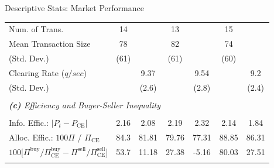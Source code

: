 \documentclass[10pt]{beamer}
\begin{document}
\begin{frame}{Descriptive Stats: Market Performance}
\begin{table}
{\begin{threeparttable}
\begin{tabular}{lcccccc}
     Num. of Trans.                             & 14        &           & 13        &           & 15        &           \\
     Mean Transaction Size                      & 78        &           & 82        &           & 74        &           \\
     \hspace{3mm}(Std. Dev.)             & (61)      &           & (61)      &           & (60)      &           \\
     Clearing Rate ($q/sec$)                 &           & 9.37      &           & 9.54      &           & 9.2       \\
     \hspace{3mm}(Std. Dev.)             &           & (2.6)     &           & (2.8)     &           & (2.4)     \\
     \\ [-1.8ex]
     \multicolumn{7}{l}{\textit{\textbf{(c)} Efficiency and Buyer-Seller Inequality}} \\
     \\ [-1.8ex]
     Info. Effic.: $\lvert P_t - P_{\text{CE}} \rvert $        & 2.16      & 2.08      & 2.19      & 2.32      & 2.14      & 1.84      \\     
     Alloc. Effic.: $100\Pi$ / $\Pi_{\text{CE}}$         & 84.3      & 81.81     & 79.76     & 77.31     & 88.85     & 86.31     \\
     
     ${100[\Pi^{\text{buy}}}/{\Pi^{\text{buy}}_{\text{CE}}} - {\Pi^{\text{sell}}}/{\Pi^{\text{sell}}_{\text{CE}}]}$ 
     & 53.7      & 11.18     & 27.38     & -5.16     & 80.03     & 27.51     \\
     \\[-1.8ex] 
    \bottomrule 
    \end{tabular}
    \begin{tablenotes}
      \footnotesize
    \end{tablenotes}
    \end{threeparttable}
   }
    \label{tab:summary_stat}
\end{table}
\end{frame}
\end{document}
